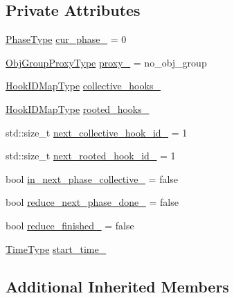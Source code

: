 \subsection*{Private Attributes}
\begin{DoxyCompactItemize}
\item 
\hyperlink{namespacevt_a46ce6733d5cdbd735d561b7b4029f6d7}{Phase\+Type} \hyperlink{structvt_1_1phase_1_1_phase_manager_a481f6b2da9da107b31d6ce8d970c7aff}{cur\+\_\+phase\+\_\+} = 0
\item 
\hyperlink{namespacevt_ad7cae989df485fccca57f0792a880a8e}{Obj\+Group\+Proxy\+Type} \hyperlink{structvt_1_1phase_1_1_phase_manager_a119ac185c79c50761d7e8c3f68b751e7}{proxy\+\_\+} = no\+\_\+obj\+\_\+group
\item 
\hyperlink{structvt_1_1phase_1_1_phase_manager_a7f9784fa7550beaa1e7d59e639169a8b}{Hook\+I\+D\+Map\+Type} \hyperlink{structvt_1_1phase_1_1_phase_manager_aafc873771fb849243f082cba71f36672}{collective\+\_\+hooks\+\_\+}
\item 
\hyperlink{structvt_1_1phase_1_1_phase_manager_a7f9784fa7550beaa1e7d59e639169a8b}{Hook\+I\+D\+Map\+Type} \hyperlink{structvt_1_1phase_1_1_phase_manager_a6a2b1be3c11f4fc91bfb84cc2c47c545}{rooted\+\_\+hooks\+\_\+}
\item 
std\+::size\+\_\+t \hyperlink{structvt_1_1phase_1_1_phase_manager_a4270d82b84c02d60c16521d4c5972657}{next\+\_\+collective\+\_\+hook\+\_\+id\+\_\+} = 1
\item 
std\+::size\+\_\+t \hyperlink{structvt_1_1phase_1_1_phase_manager_a22a3945b22c96b581a1aa1cdadd149e4}{next\+\_\+rooted\+\_\+hook\+\_\+id\+\_\+} = 1
\item 
bool \hyperlink{structvt_1_1phase_1_1_phase_manager_ac57c867b3d30923a0241ef462a275f5c}{in\+\_\+next\+\_\+phase\+\_\+collective\+\_\+} = false
\item 
bool \hyperlink{structvt_1_1phase_1_1_phase_manager_a28428326d10fe9485d3da07e8650d352}{reduce\+\_\+next\+\_\+phase\+\_\+done\+\_\+} = false
\item 
bool \hyperlink{structvt_1_1phase_1_1_phase_manager_a2d4f894445c848ea2ead4a4fe0919eb0}{reduce\+\_\+finished\+\_\+} = false
\item 
\hyperlink{namespacevt_a876a9d0cd5a952859c72de8a46881442}{Time\+Type} \hyperlink{structvt_1_1phase_1_1_phase_manager_a77b80e03b225c32acd50ed727fe4aafd}{start\+\_\+time\+\_\+}
\end{DoxyCompactItemize}
\subsection*{Additional Inherited Members}


